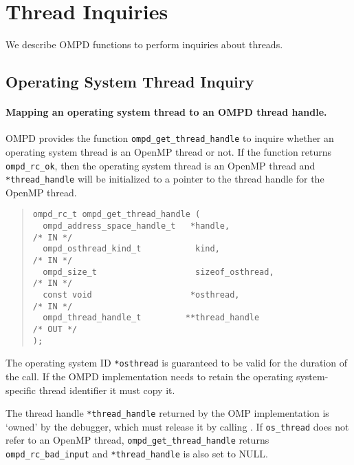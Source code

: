 \section{Thread Inquiries}

We describe OMPD functions to perform inquiries about threads.

\subsection{Operating System Thread Inquiry}

\paragraph{Mapping an operating system thread to an OMPD thread handle.}
OMPD provides the function \verb|ompd_get_thread_handle|
to inquire whether an operating system thread is an OpenMP
thread or not.
If the function returns \verb|ompd_rc_ok|, then the operating
system thread is an OpenMP thread and \verb|*thread_handle|
will be initialized to a pointer to the thread handle for
the OpenMP thread.

\begin{quote}
\begin{lstlisting}
ompd_rc_t ompd_get_thread_handle (
  ompd_address_space_handle_t   *handle,                            /* IN */
  ompd_osthread_kind_t           kind,                              /* IN */
  ompd_size_t                    sizeof_osthread,                   /* IN */
  const void                    *osthread,                          /* IN */
  ompd_thread_handle_t         **thread_handle                     /* OUT */
);
\end{lstlisting}
\end{quote}
The operating system ID \texttt{*osthread} is guaranteed
to be valid for the duration of the call.
If the OMPD implementation needs to retain the operating system-specific
thread identifier it must copy it.

The thread handle \texttt{*thread\_handle} returned by the OMP implementation
is `owned' by the debugger, which must release it by calling
.
If \texttt{os\_thread} does not refer to an OpenMP thread,
\texttt{ompd\_get\_thread\_handle} returns \texttt{ompd\_rc\_bad\_input}
and \texttt{*thread\_handle} is also set to NULL.

